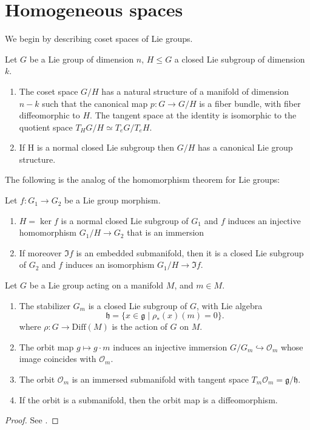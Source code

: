 \documentclass{report}
\begin{document}
\section{Homogeneous spaces}
We begin by describing coset spaces of Lie groups.
\begin{theorem}
    Let $G$ be a Lie group of dimension $n$, $H \leq G$ a closed Lie subgroup of dimension $k$.
    \begin{enumerate}[label = (\roman*)]
        \item The coset space $G/H$ has a natural structure of a manifold of dimension $n-k$ such that the canonical map $p: G \to G/H$ is a fiber bundle, with fiber diffeomorphic to $H$.
        The tangent space at the identity is isomorphic to the quotient space $T_H G/H \simeq T_eG/T_eH$.
        \item If H is a normal closed Lie subgroup then $G/H$ has a canonical Lie group structure.
    \end{enumerate}
\end{theorem}

The following is the analog of the homomorphism theorem for Lie groups:
\begin{theorem}
    Let $f:G_1 \to G_2$ be a Lie group morphism.
    \begin{enumerate}[label = (\roman*)]
        \item $H = \ker f$ is a normal closed Lie subgroup of $G_1$ and $f$ induces an injective homomorphism $G_1/H \to G_2$ that is an immersion
        \item If moreover $\Im f$ is an embedded submanifold, then it is a closed Lie subgroup of $G_2$ and $f$ induces an isomorphism $G_1/H \to \Im f$.
    \end{enumerate}
\end{theorem}


\begin{theorem}
    Let $G$ be a Lie group acting on a manifold $M$, and $m \in M$.
    \begin{enumerate}[label = (\roman*)]
        \item The stabilizer $G_m$ is a closed Lie subgroup of $G$, with Lie algebra
        \[
        \mathfrak h = \{ x \in \mathfrak g \mid \rho_*(x)(m) = 0 \}.
        \]
        where $\rho: G \to \mathrm{Diff}(M)$ is the action of $G$ on $M$.
        \item The orbit map $g \mapsto g \cdot m$ induces an injective immersion $G/G_m \hookrightarrow \mathcal O_m$ whose image coincides with $\mathcal O_m$.
        \item The orbit $\mathcal O_m$ is an immersed submanifold with tangent space $T_m \mathcal O_m = \mathfrak g / \mathfrak h $.
        \item If the orbit is a submanifold, then the orbit map is a diffeomorphism.
    \end{enumerate}
\end{theorem}
\begin{proof}
See \cite[Theorem 2.20, Theorem 3.29]{kirillov2008introduction}.
\end{proof}
\end{document}
